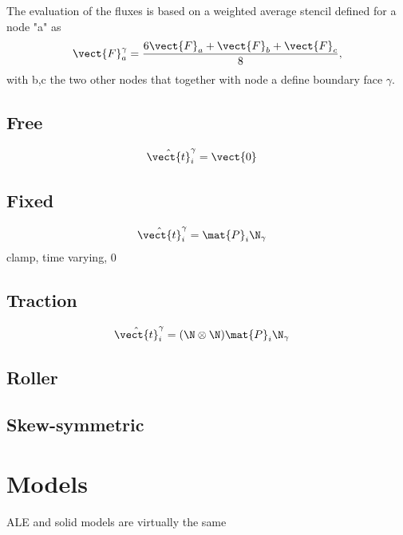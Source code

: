 The evaluation of the fluxes is based on a weighted average stencil \cite{Luo1995,Ibrahim2018} defined for a node "a" as 
\begin{equation}
	\vect{F}^\gamma_a = \frac{6\vect{F}_a + \vect{F}_b + \vect{F}_c}{8},
\end{equation}
with b,c the two other nodes that together with node a define boundary face $\gamma$.

\subsection{Free}
\begin{subequations}
\begin{align}
	\hat{\vect{t}}_i^{\gamma} &= \vect{0}
\end{align}
\end{subequations}
\subsection{Fixed}
\begin{subequations}
	\begin{align}
		\hat{\vect{t}}_i^{\gamma} &= \mat{P}_i \N_\gamma
	\end{align}
\end{subequations}
clamp, time varying, 0
\subsection{Traction}
\begin{subequations}
	\begin{align}
		\hat{\vect{t}}_i^{\gamma} &= (\N\otimes\N) \mat{P}_i \N_\gamma
	\end{align}
\end{subequations}
\subsection{Roller}
\subsection{Skew-symmetric}



\newpage
\section{Models}
ALE and solid models are virtually the same 



\newpage 
